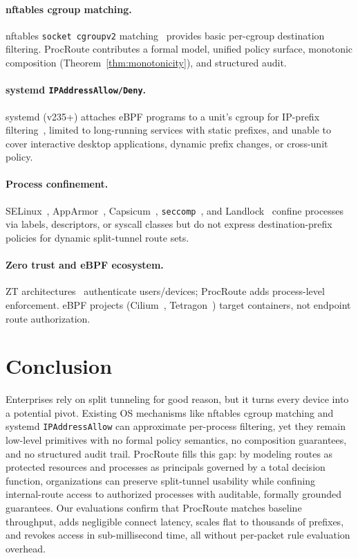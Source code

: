 \documentclass[sigconf]{acmart}
\begin{document}
\paragraph{nftables cgroup matching.}
nftables \texttt{socket~cgroupv2} matching~\cite{nftables_wiki_cgroups}
provides basic per-cgroup destination filtering.
ProcRoute contributes a formal model, unified policy surface, monotonic
composition (Theorem~\ref{thm:monotonicity}), and structured
audit.

\paragraph{systemd \texttt{IPAddressAllow/Deny}.}
systemd (v235+) attaches eBPF programs to a unit's cgroup for
IP-prefix filtering~\cite{systemd_resource_control}, limited
to long-running services with static prefixes, and unable to
cover interactive desktop applications, dynamic prefix changes,
or cross-unit policy.

\paragraph{Process confinement.}
SELinux~\cite{selinux},
AppArmor~\cite{apparmor},
Capsicum~\cite{capsicum},
\texttt{seccomp}~\cite{seccomp}, and
Landlock~\cite{landlock} confine processes via labels,
descriptors, or syscall classes but do not express
destination-prefix policies for dynamic split-tunnel
route sets.

\paragraph{Zero trust and eBPF ecosystem.}
ZT architectures~\cite{nist_sp80020r1,beyondcorp} authenticate
users/devices; ProcRoute adds process-level enforcement.
eBPF projects (Cilium~\cite{cilium}, Tetragon~\cite{tetragon})
target containers, not endpoint route authorization.

\section{Conclusion}
Enterprises rely on split tunneling for good reason, but it turns
every device into a potential pivot.  Existing OS mechanisms like
nftables cgroup matching and systemd \texttt{IPAddressAllow} can
approximate per-process filtering, yet they remain low-level
primitives with no formal policy semantics, no composition
guarantees, and no structured audit trail.
ProcRoute fills this gap: by modeling routes as protected resources
and processes as principals governed by a total decision function,
organizations can preserve split-tunnel usability while confining
internal-route access to authorized processes with auditable,
formally grounded guarantees.
Our evaluations
confirm that ProcRoute matches baseline throughput, adds negligible
connect latency, scales flat to thousands of prefixes, and revokes
access in sub-millisecond time, all without per-packet rule
evaluation overhead.
\end{document}
